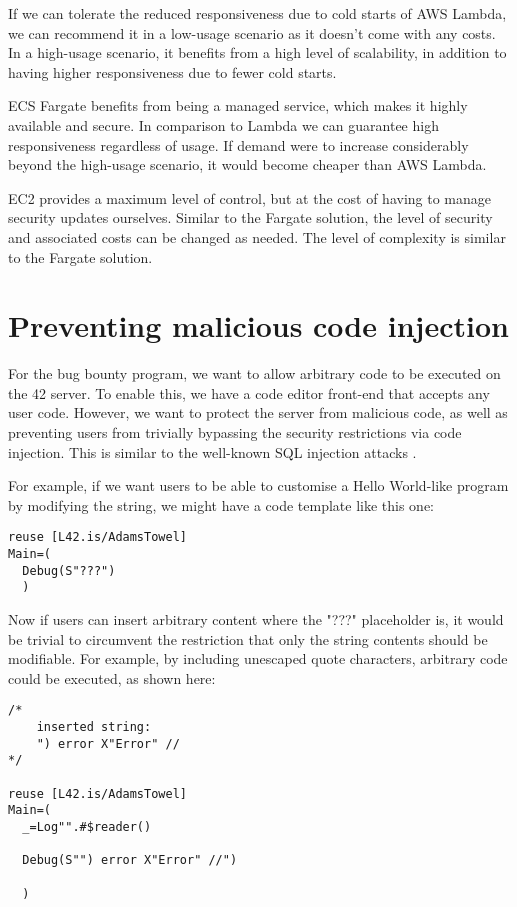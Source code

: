 If we can tolerate the reduced responsiveness due to cold starts of AWS Lambda, we can recommend it in a low-usage scenario as it doesn't come with any costs. In a high-usage scenario, it benefits from a high level of scalability, in addition to having higher responsiveness due to fewer cold starts.

ECS Fargate benefits from being a managed service, which makes it highly available and secure. In comparison to Lambda we can guarantee high responsiveness regardless of usage. If demand were to increase considerably beyond the high-usage scenario, it would become cheaper than AWS Lambda.

EC2 provides a maximum level of control, but at the cost of having to manage security updates ourselves. Similar to the Fargate solution, the level of security and associated costs can be changed as needed. The level of complexity is similar to the Fargate solution.

\section{Preventing malicious code injection}

For the bug bounty program, we want to allow arbitrary code to be executed on the 42 server. To enable this, we have a code editor front-end that accepts any user code. However, we want to protect the server from malicious code, as well as preventing users from trivially bypassing the security restrictions via code injection. This is similar to the well-known SQL injection attacks \cite{halfond2006classification}.

For example, if we want users to be able to customise a Hello World-like program by modifying the string, we might have a code template like this one:

\begin{lstlisting}[caption=Hello World-like program template]
reuse [L42.is/AdamsTowel]
Main=(
  Debug(S"???")
  )
\end{lstlisting}

Now if users can insert arbitrary content where the "???" placeholder is, it would be trivial to circumvent the restriction that only the string contents should be modifiable. For example, by including unescaped quote characters, arbitrary code could be executed, as shown here:

\begin{lstlisting}[caption=Code injection example]
/*
    inserted string:
    ") error X"Error" //
*/

reuse [L42.is/AdamsTowel]
Main=(
  _=Log"".#$reader()

  Debug(S"") error X"Error" //")
  
  )
\end{lstlisting}

